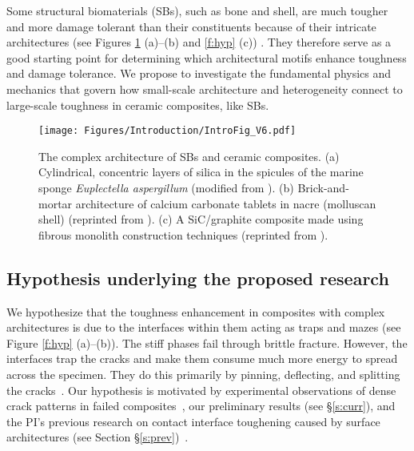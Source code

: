 \documentclass[10pt,letterpaper]{article}
\begin{document}
    Some structural biomaterials (SBs), such as bone and shell, are much tougher and more damage tolerant than their constituents because of their intricate architectures (see Figures \ref{f:intro} (a)--(b) and \ref{f:hyp} (c)) \cite{wegst2015bioinspired,kamat2000structural,barthelat2011toughness,currey2003well}. They therefore serve as a good starting point for determining which architectural motifs enhance toughness and damage tolerance. We propose to investigate the fundamental physics and mechanics that govern how small-scale architecture and heterogeneity connect to large-scale toughness in ceramic composites, like SBs.

    \begin{figure}[h!]
      \centering
        \texttt{[image: Figures/Introduction/IntroFig\_V6.pdf]}
        \caption{ \footnotesize The complex architecture of SBs and ceramic composites. (a) Cylindrical, concentric layers of silica in the spicules of the marine sponge \textit{Euplectella aspergillum} (modified from \cite{monn2015new}). (b) Brick-and-mortar architecture of calcium carbonate tablets in nacre (molluscan shell) (reprinted from \cite{ritchie2011conflicts}). (c) A SiC/graphite composite made using fibrous monolith construction techniques (reprinted from \cite{baskaran1993fibrous}).
          }
        \label{f:intro}
    \end{figure}

  \subsection{Hypothesis underlying the proposed research}
       \label{s:hyp}
       We hypothesize that the toughness enhancement in composites with complex architectures is due to the interfaces within them acting as traps and mazes (see Figure \ref{f:hyp} (a)--(b)). The stiff phases fail through brittle fracture. However, the interfaces trap the cracks and make them consume much more energy to spread across the specimen. They do this primarily by pinning, deflecting, and splitting the cracks~\cite{gao1989first,dalmas2009crack,gu1997crack}. Our hypothesis is motivated by experimental observations of dense crack patterns in failed composites~\cite{barthelat2007experimental,poissant2010novel}, our preliminary results (see \S \ref{s:curr}), and the PI's previous research on contact interface toughening caused by surface architectures (see Section \S \ref{s:prev})~\cite{kesari2010role,kesari2011mechanics,kesariPML}.
\end{document}
